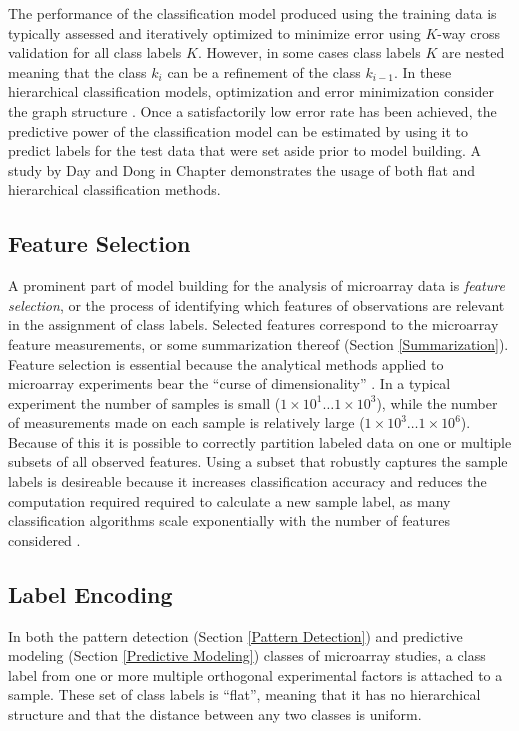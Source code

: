 The performance of the classification model produced using the training data is
typically assessed and iteratively optimized to minimize error using $K$-way
cross validation for all class labels $K$.  However, in some cases class labels
$K$ are nested meaning that the class $k_{i}$ can be a refinement of the
class $k_{i-1}$.  In these hierarchical classification models, optimization and
error minimization consider the graph structure \cite{pachinko}.  Once a
satisfactorily low error rate has been achieved, the predictive power of the
classification model can be estimated by using it to predict labels for the
test data that were set aside prior to model building.  A study by Day and Dong
in Chapter \classchapter demonstrates the usage of both flat and hierarchical
classification methods.

\subsection{Feature Selection}
\label{Feature Selection}

A prominent part of model building for the analysis of microarray data is
\emph{feature selection}, or the process of identifying which features of
observations are relevant in the assignment of class labels.  Selected features
correspond to the microarray feature measurements, or some summarization
thereof (Section \ref{Summarization}).  Feature selection is essential because
the analytical methods applied to microarray experiments bear the ``curse of
dimensionality'' \cite{Bellman_1957}.  In a typical experiment the number of
samples is small ($1{\times}10^1 \dots 1{\times}10^3$), while the number of
measurements made on each sample is relatively large ($1{\times}10^3 \dots
1{\times}10^6$).  Because of this it is possible to correctly partition labeled
data on one or multiple subsets of all observed features.  Using a subset that
robustly captures the sample labels is desireable because it increases
classification accuracy and reduces the computation required required to
calculate a new sample label, as many classification algorithms scale
exponentially with the number of features considered \cite{john94irrelevant}.

\subsection{Label Encoding}
\label{Label Encoding}

In both the pattern detection (Section \ref{Pattern Detection}) and
predictive modeling (Section \ref{Predictive Modeling}) classes of microarray
studies, a class label from one or more multiple orthogonal experimental
factors is attached to a sample.  These set of class labels is ``flat'',
meaning that it has no hierarchical structure and that the distance between any
two classes is uniform.  


